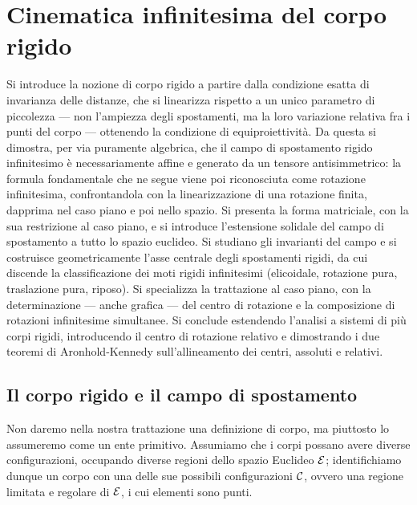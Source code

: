 \graphicspath{{Parti/P03-Meccanica_SR/C01-Cinematica_CR/Figure/}}
\chapter{Cinematica infinitesima del corpo rigido}\label{cap:cinematica_infinitesima}


\begin{sommario}
	Si introduce la nozione di corpo rigido a partire dalla condizione
	esatta di invarianza delle distanze, che si linearizza rispetto a un
	unico parametro di piccolezza --- non l'ampiezza degli spostamenti, ma
	la loro variazione relativa fra i punti del corpo --- ottenendo la
	condizione di equiproiettività. Da questa si dimostra, per via
	puramente algebrica, che il campo di spostamento rigido infinitesimo è
	necessariamente affine e generato da un tensore antisimmetrico: la
	formula fondamentale che ne segue viene poi riconosciuta come
	rotazione infinitesima, confrontandola con la linearizzazione di una
	rotazione finita, dapprima nel caso piano e poi nello spazio. Si
	presenta la forma matriciale, con la sua restrizione al caso piano, e
	si introduce l'estensione solidale del campo di spostamento a tutto lo
	spazio euclideo. Si studiano gli invarianti del campo e si costruisce
	geometricamente l'asse centrale degli spostamenti rigidi, da cui
	discende la classificazione dei moti rigidi infinitesimi (elicoidale,
	rotazione pura, traslazione pura, riposo). Si specializza la
	trattazione al caso piano, con la determinazione --- anche grafica ---
	del centro di rotazione e la composizione di rotazioni infinitesime
	simultanee. Si conclude estendendo l'analisi a sistemi di più corpi
	rigidi, introducendo il centro di rotazione relativo e dimostrando i
	due teoremi di Aronhold-Kennedy sull'allineamento dei centri, assoluti
	e relativi.
\end{sommario}



\section{Il corpo rigido e il campo di spostamento}\label{sez.CR}
Non daremo nella nostra trattazione una definizione di corpo, ma piuttosto lo assumeremo come un ente primitivo.
Assumiamo  che i corpi possano avere diverse configurazioni, occupando diverse regioni dello spazio Euclideo $\mathcal{E}$; identifichiamo dunque un corpo con una delle sue possibili configurazioni $\mathcal{C}$, ovvero una regione limitata e regolare di $\mathcal{E}$, i cui elementi sono punti.

